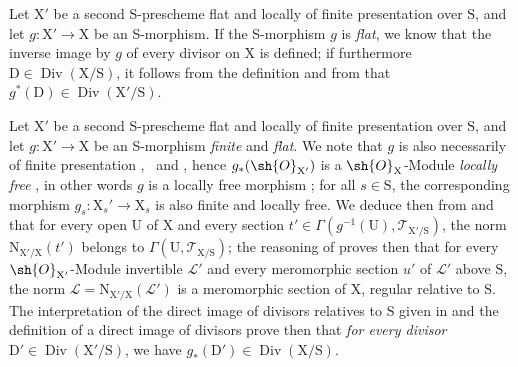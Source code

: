 \begin{env}[21.15.7]
\label{IV.21.15.7}
Let $\mathrm{X}'$ be a second S-prescheme flat and locally of finite presentation over $\mathrm{S}$, and let $g:\mathrm{X}'\to\mathrm{X}$ be an S-morphism.
If the S-morphism $g$ is \emph{flat}, we know  that the inverse image by $g$ of every divisor on $\mathrm{X}$ is defined; if furthermore $\mathrm{D}\in\operatorname{Div}(\mathrm{X}/\mathrm{S})$, it follows from the definition  and from  that $g^*(\mathrm{D})\in\operatorname{Div}(\mathrm{X}'/\mathrm{S})$.
\end{env}

\begin{env}[21.15.8]
\label{IV.21.15.8}
Let $\mathrm{X}'$ be a second S-prescheme flat and locally of finite presentation over $\mathrm{S}$, and let $g:\mathrm{X}'\to\mathrm{X}$ be an S-morphism \emph{finite} and \emph{flat}.
We note that $g$ is also necessarily of finite presentation ,~ and , hence $g_*(\sh{O}_{\mathrm{X}'})$ is a $\sh{O}_{\mathrm{X}}$-Module \emph{locally free} , in other words $g$ is a locally free morphism ; for all $s\in\mathrm{S}$, the corresponding morphism $g_s:\mathrm{X}_s'\to\mathrm{X}_s$ is also finite and locally free.
We deduce then from  and  that for every open $\mathrm{U}$ of $\mathrm{X}$ and every section $t'\in\Gamma(g^{-1}(\mathrm{U}),\mathscr{T}_{\mathrm{X}'/\mathrm{S}})$, the norm $\mathrm{N}_{\mathrm{X}'/\mathrm{X}}(t')$ belongs to $\Gamma(\mathrm{U},\mathscr{T}_{\mathrm{X}/\mathrm{S}})$; the reasoning of  proves then that for every $\sh{O}_{\mathrm{X}'}$-Module invertible $\mathscr{L}'$ and every meromorphic section $u'$ of $\mathscr{L}'$ above $\mathrm{S}$, the norm $\mathscr{L}=\mathrm{N}_{\mathrm{X}'/\mathrm{X}}(\mathscr{L}')$ is a meromorphic section of $\mathrm{X}$, regular relative to $\mathrm{S}$.
The interpretation of the direct image of divisors relatives to $\mathrm{S}$ given in  and the definition of a direct image of divisors  prove then that \emph{for every divisor} $\mathrm{D}'\in\operatorname{Div}(\mathrm{X}'/\mathrm{S})$, we have $g_*(\mathrm{D}')\in\operatorname{Div}(\mathrm{X}/\mathrm{S})$.
\end{env}


